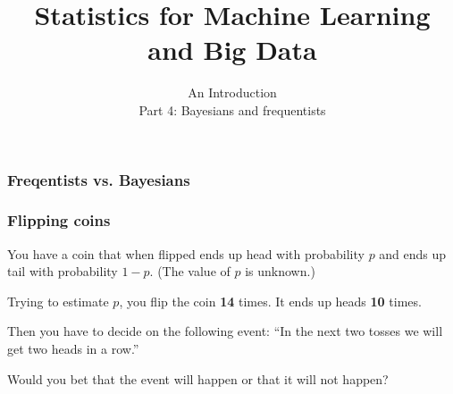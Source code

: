 

\title
{Statistics for Machine Learning and Big Data}
\subtitle{An Introduction\\[6mm] Part 4: Bayesians and frequentists}




\begin{frame}
  \titlepage
\end{frame}

\begin{frame}

\end{frame}

\begin{frame}
  \frametitle{Freqentists vs. Bayesians}

  \vfill
  \centerline{}
\end{frame}


\begin{frame}
  \frametitle{Flipping coins}

  You have a coin that when flipped ends up head with probability $p$
  and ends up tail with probability $1-p$. (The value of $p$ is
  unknown.)

  Trying to estimate $p$, you flip the coin \textbf{14} times. It ends
  up heads \textbf{10} times.

  Then you have to decide on the following event: ``In the next two
  tosses we will get two heads in a row.''

  Would you bet that the event will happen or that it will not happen?

  \vfill

  \cnote{

  }
\end{frame}

